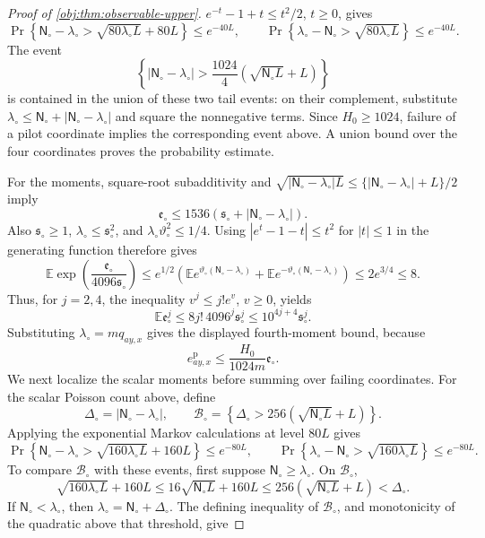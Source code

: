 \documentclass[11pt]{article}
\begin{document}
\begin{proof}[Proof of \cref{obj:thm:observable-upper}]
\(e^{-t}-1+t\le t^2/2\), \(t\ge0\), gives
\[
\Pr\!\left\{
\mathsf N_\circ-\lambda_\circ>
\sqrt{80\lambda_\circ L}+80L
\right\}\le e^{-40L},
\qquad
\Pr\!\left\{
\lambda_\circ-\mathsf N_\circ>
\sqrt{80\lambda_\circ L}
\right\}\le e^{-40L}.
\]
The event
\[
\left\{
|\mathsf N_\circ-\lambda_\circ|
>\frac{1024}{4}\left(\sqrt{\mathsf N_\circ L}+L\right)
\right\}
\]
is contained in the union of these two tail events: on their complement, substitute
\(\lambda_\circ\le\mathsf N_\circ+|\mathsf N_\circ-\lambda_\circ|\) and square the nonnegative terms. Since \(H_0\ge1024\), failure of a pilot coordinate implies the corresponding event above. A union bound over the four coordinates proves the probability estimate.

For the moments, square-root subadditivity and
\(\sqrt{|\mathsf N_\circ-\lambda_\circ|L}
\le\{|\mathsf N_\circ-\lambda_\circ|+L\}/2\) imply
\[
\mathfrak e_\circ
\le1536\left(\mathfrak s_\circ+
|\mathsf N_\circ-\lambda_\circ|\right).
\]
Also \(\mathfrak s_\circ\ge1\),
\(\lambda_\circ\le\mathfrak s_\circ^2\), and
\(\lambda_\circ\vartheta_\circ^2\le1/4\). Using
\(|e^t-1-t|\le t^2\) for \(|t|\le1\) in the generating function therefore gives
\[
\mathbb E\exp\left(\frac{\mathfrak e_\circ}{4096\mathfrak s_\circ}\right)
\le
e^{1/2}\left(
\mathbb E e^{\vartheta_\circ(\mathsf N_\circ-\lambda_\circ)}
+
\mathbb E e^{-\vartheta_\circ(\mathsf N_\circ-\lambda_\circ)}
\right)
\le2e^{3/4}\le8.
\]
Thus, for \(j=2,4\), the inequality \(v^j\le j!e^v\), \(v\ge0\), yields
\[
\mathbb E\mathfrak e_\circ^j
\le8j!\,4096^j\mathfrak s_\circ^j
\le10^{4j+4}\mathfrak s_\circ^j.
\]
Substituting \(\lambda_\circ=mq_{ay,x}\) gives the displayed fourth-moment bound, because
\[
e_{ay,x}^{\mathrm p}
\le\frac{H_0}{1024m}\mathfrak e_\circ.
\]
We next localize the scalar moments before summing over failing coordinates. For the scalar Poisson count above, define
\[
\Delta_\circ=|\mathsf N_\circ-\lambda_\circ|,
\qquad
\mathcal B_\circ=
\left\{
\Delta_\circ>256\left(\sqrt{\mathsf N_\circ L}+L\right)
\right\}.
\]
Applying the exponential Markov calculations at level \(80L\) gives
\[
\Pr\!\left\{
\mathsf N_\circ-\lambda_\circ>
\sqrt{160\lambda_\circ L}+160L
\right\}\le e^{-80L},
\qquad
\Pr\!\left\{
\lambda_\circ-\mathsf N_\circ>
\sqrt{160\lambda_\circ L}
\right\}\le e^{-80L}.
\]
To compare \(\mathcal B_\circ\) with these events, first suppose \(\mathsf N_\circ\ge\lambda_\circ\). On \(\mathcal B_\circ\),
\[
\sqrt{160\lambda_\circ L}+160L
\le16\sqrt{\mathsf N_\circ L}+160L
\le256\left(\sqrt{\mathsf N_\circ L}+L\right)
<\Delta_\circ.
\]
If \(\mathsf N_\circ<\lambda_\circ\), then \(\lambda_\circ=\mathsf N_\circ+\Delta_\circ\). The defining inequality of \(\mathcal B_\circ\), and monotonicity of the quadratic above that threshold, give

\end{proof}
\end{document}
